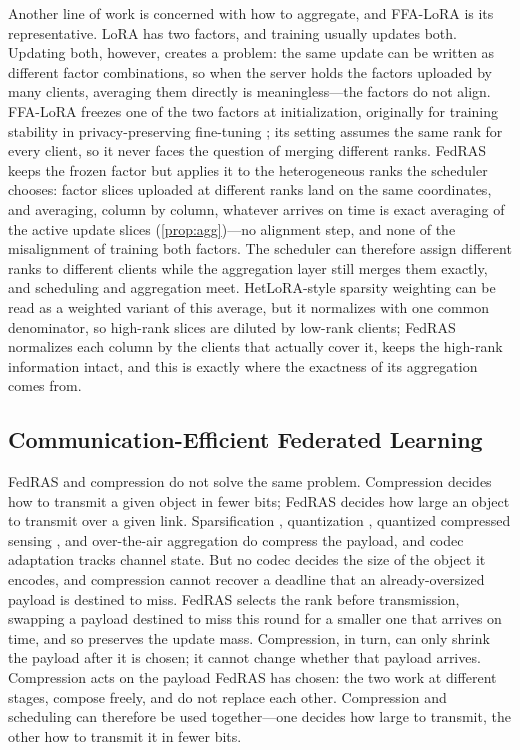 \documentclass[a4paper,fleqn]{cas-dc}
\begin{document}
\par
Another line of work is concerned with how to aggregate, and FFA-LoRA is its representative. LoRA has two factors, and training usually updates both. Updating both, however, creates a problem: the same update can be written as different factor combinations, so when the server holds the factors uploaded by many clients, averaging them directly is meaningless---the factors do not align. FFA-LoRA freezes one of the two factors at initialization, originally for training stability in privacy-preserving fine-tuning \cite{sun2024ffalora}; its setting assumes the same rank for every client, so it never faces the question of merging different ranks. FedRAS keeps the frozen factor but applies it to the heterogeneous ranks the scheduler chooses: factor slices uploaded at different ranks land on the same coordinates, and averaging, column by column, whatever arrives on time is exact averaging of the active update slices (\cref{prop:agg})---no alignment step, and none of the misalignment of training both factors. The scheduler can therefore assign different ranks to different clients while the aggregation layer still merges them exactly, and scheduling and aggregation meet. HetLoRA-style sparsity weighting can be read as a weighted variant of this average, but it normalizes with one common denominator, so high-rank slices are diluted by low-rank clients; FedRAS normalizes each column by the clients that actually cover it, keeps the high-rank information intact, and this is exactly where the exactness of its aggregation comes from.
\subsection{Communication-Efficient Federated Learning}
FedRAS and compression do not solve the same problem. Compression decides how to transmit a given object in fewer bits; FedRAS decides how large an object to transmit over a given link. Sparsification \cite{lin2018deep}, quantization \cite{liu2023adaptivequant,reisizadeh2020fedpaq}, quantized compressed sensing \cite{oh2023fedqcs,oh2024fedvqcs}, and over-the-air aggregation \cite{kim2023beamforming} do compress the payload, and codec adaptation tracks channel state. But no codec decides the size of the object it encodes, and compression cannot recover a deadline that an already-oversized payload is destined to miss. FedRAS selects the rank before transmission, swapping a payload destined to miss this round for a smaller one that arrives on time, and so preserves the update mass. Compression, in turn, can only shrink the payload after it is chosen; it cannot change whether that payload arrives. Compression acts on the payload FedRAS has chosen: the two work at different stages, compose freely, and do not replace each other. Compression and scheduling can therefore be used together---one decides how large to transmit, the other how to transmit it in fewer bits.
\end{document}
